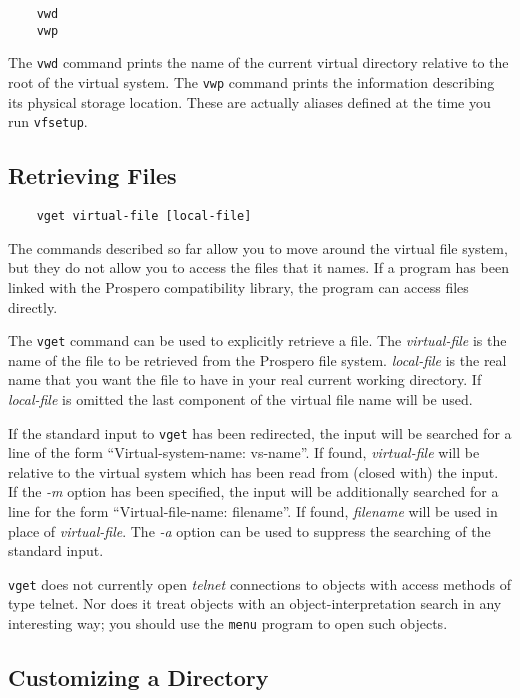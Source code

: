 \begin{verbatim}
    vwd
    vwp
\end{verbatim}

The {\tt vwd} command prints the name of the current virtual directory
relative to the root of the virtual system.  The {\tt vwp} command
prints the information describing its physical storage location.
These are actually aliases defined at the time you run {\tt vfsetup}.

\subsection{Retrieving Files}

\begin{verbatim}
    vget virtual-file [local-file]
\end{verbatim}

The commands described so far allow you to move around the virtual
file system, but they do not allow you to access the files that it
names.  If a program has been linked with the Prospero compatibility
library, the program can access files directly.  

The {\tt vget} command can be used to explicitly retrieve a file.  The
{\it virtual-file} is the name of the file to be retrieved from the
Prospero file system.  {\it local-file} is the real name that you want
the file to have in your real current working directory.  If {\it
local-file} is omitted the last component of the virtual file name
will be used.

If the standard input to {\tt vget} has been redirected, the input
will be searched for a line of the form ``Virtual-system-name:
vs-name''.  If found, {\em virtual-file} will be relative to the
virtual system which has been read from (closed with) the input.  If
the {\em -m} option has been specified, the input will be additionally
searched for a line for the form ``Virtual-file-name: filename''.  If
found, {\em filename} will be used in place of {\it virtual-file}.
The {\em -a} option can be used to suppress the searching of the
standard input.

{\tt vget} does not currently open {\em telnet} connections to objects
with access methods of type {\sc telnet}.  Nor does it treat objects
with an {\sc object-interpretation} {\sc search} in any interesting
way; you should use the {\tt menu} program to open such objects.

\subsection{Customizing a Directory\label{customizing}}


